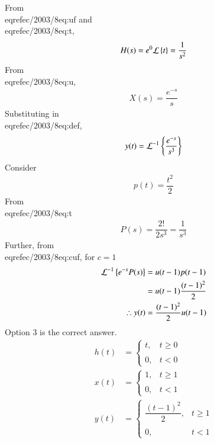 From \\eqref{ec/2003/8eq:uf} and \\eqref{ec/2003/8eq:t}, 
\begin{align}
H(s)=e^{0}\mathcal{L}\left\{t\right\}=\dfrac{1}{s^2}
\end{align}
From \\eqref{ec/2003/8eq:u}, 
\begin{align}
X(s)=\dfrac{e^{-s}}{s}
\end{align}
Substituting in \\eqref{ec/2003/8eq:def},
\begin{align}
y(t)=\mathcal{L}^{-1}\left\{\dfrac{e^{-s}}{s^3}\right\}
\end{align}
Consider 
\begin{align}
    p(t)=\dfrac{t^{2}}{2}
\end{align}
From \\eqref{ec/2003/8eq:t}
\begin{align}
    P(s)=\dfrac{2!}{2s^3}=\dfrac{1}{s^3}
\end{align}
Further, from \\eqref{ec/2003/8eq:cuf}, for $c=1$
\begin{align}
    \mathcal{L}^{-1}\left\{e^{-s}P(s)\right\}&=u(t-1)p(t-1)\\
    &=u(t-1)\dfrac{(t-1)^2}{2}\\
    \therefore y(t)&=\dfrac{(t-1)^2}{2}u(t-1)
\end{align}
Option 3 is the correct answer.
\begin{align}
    h(t)&=\begin{cases}
	t, & t \geq 0 \\~\\[-1em]
	0, & t <0
	\end{cases}\\
	x(t)&=\begin{cases}
	1, & t \geq 1 \\~\\[-1em]
	0, & t <1
	\end{cases}\\
	y(t)&=\begin{cases}
	\dfrac{(t-1)^2}{2}, & t \geq 1 \\~\\[-1em]
	0, & t <1
	\end{cases}
\end{align}
